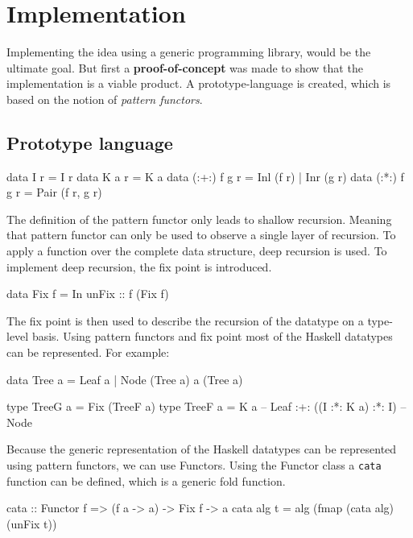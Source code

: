 \section{Implementation}

Implementing the idea using a generic programming library, would be the ultimate goal. But first a \textbf{proof-of-concept} was made to show that the implementation is a viable product. A prototype-language is created, which is based on the notion of \textit{pattern functors}.

\subsection{Prototype language}
\begin{haskell}
data I r         = I r                  
data K a r       = K a                  
data (:+:) f g r = Inl (f r) | Inr (g r)
data (:*:) f g r = Pair (f r, g r)
\end{haskell}

The definition of the pattern functor only leads to shallow recursion. Meaning that pattern functor can only be used to observe a single layer of recursion. To apply a function over the complete data structure, deep recursion is used. To implement deep recursion, the fix point is introduced.

\begin{haskell}
data Fix f = In { unFix :: f (Fix f) }
\end{haskell}

The fix point is then used to describe the recursion of the datatype on a type-level basis. Using pattern functors and fix point most of the Haskell datatypes can be represented. For example:

\begin{haskell}
data Tree a = Leaf a
            | Node (Tree a) a (Tree a)

type TreeG a = Fix (TreeF a)
type TreeF a = K a                  -- Leaf
            :+: ((I :*: K a) :*: I) -- Node
\end{haskell}

Because the generic representation of the Haskell datatypes can be represented using pattern functors, we can use Functors. Using the Functor class a \texttt{cata} function can be defined, which is a generic fold function.

\begin{haskell}
cata :: Functor f => (f a -> a) -> Fix f -> a
cata alg t = alg (fmap (cata alg) (unFix t))
\end{haskell}

